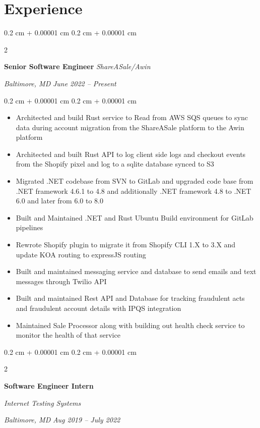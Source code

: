 \documentclass[10pt, letterpaper]{article}
\newenvironment{highlights}{
    \begin{itemize}[
        topsep=0.10 cm,
        parsep=0.10 cm,
        partopsep=0pt,
        itemsep=0pt,
        leftmargin=0.4 cm + 10pt
        ]
    }{
\end{itemize}
} %
\newenvironment{onecolentry}{
    \begin{adjustwidth}{
            0.2 cm + 0.00001 cm
        }{
            0.2 cm + 0.00001 cm
        }
    }{
    \end{adjustwidth}
} %
\newenvironment{twocolentry}[2][]{
    \onecolentry
    \def\secondColumn{#2}
    \setcolumnwidth{\fill, 4.5 cm}
    \begin{paracol}{2}
    }{
        \switchcolumn \raggedleft \secondColumn
    \end{paracol}
    \endonecolentry
} %
\begin{document}
\section{Experience}
\begin{twocolentry}{
    \textit{Baltimore, MD}
    \textit{June 2022 – Present}}
    \textbf{Senior Software Engineer}
    \textit{ShareASale/Awin}
\end{twocolentry}
\begin{onecolentry}
    \begin{highlights}
        \item Architected and build Rust service to Read  from AWS SQS queues to sync data during account migration from the ShareASale platform to the Awin platform
        \item Architected and built Rust API to log client side logs and checkout events from the Shopify pixel and log to a sqlite database synced to S3
        \item Migrated .NET codebase from SVN to GitLab and upgraded code base from .NET framework 4.6.1 to 4.8 and additionally .NET framework 4.8 to .NET 6.0 and later from 6.0 to 8.0
        \item Built and Maintained .NET and Rust Ubuntu Build environment for GitLab pipelines
        \item Rewrote Shopify plugin to migrate it from Shopify CLI 1.X to 3.X and update KOA routing to expressJS routing
        \item Built and maintained messaging service and database to send emails and text messages through Twilio API
        \item Built and maintained Rest API and Database for tracking fraudulent acts and fraudulent account details with IPQS integration
        \item Maintained Sale Processor along with building out health check service to monitor the health of that service
        \end{highlights}
    \end{onecolentry}
    \vspace{0.2 cm}
    \begin{twocolentry}{
            \textit{Baltimore, MD}
        \textit{Aug 2019 – July 2022}}
        \textbf{Software Engineer Intern}

        \textit{Internet Testing Systems}
    \end{twocolentry}
    \vspace{0.10 cm}
\end{document}
